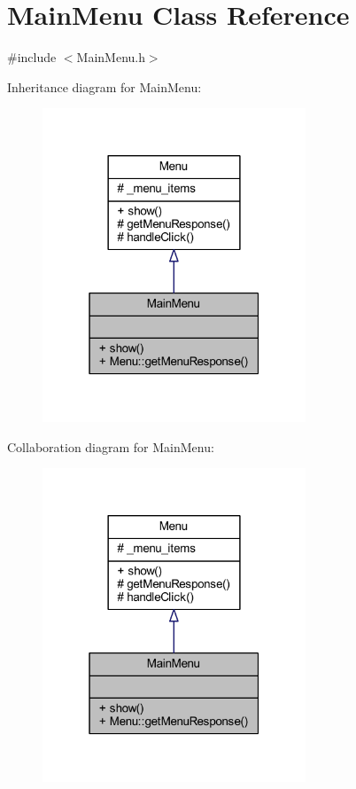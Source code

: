 \hypertarget{class_main_menu}{\section{Main\+Menu Class Reference}
\label{class_main_menu}
}


{\ttfamily \#include $<$Main\+Menu.\+h$>$}



Inheritance diagram for Main\+Menu\+:\nopagebreak
\begin{figure}[H]
\begin{center}
\leavevmode
\includegraphics[width=223pt]{class_main_menu__inherit__graph}
\end{center}
\end{figure}


Collaboration diagram for Main\+Menu\+:\nopagebreak
\begin{figure}[H]
\begin{center}
\leavevmode
\includegraphics[width=223pt]{class_main_menu__coll__graph}
\end{center}
\end{figure}
